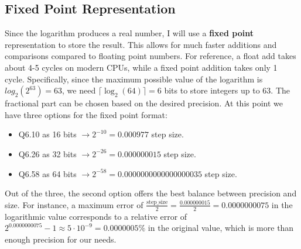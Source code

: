 \documentclass[11pt]{article}
\begin{document}
\subsection{Fixed Point Representation}
Since the logarithm produces a real number, I will use a \textbf{fixed point} representation to store the result. This allows for much faster additions and comparisons compared to floating point numbers. For reference, a float add takes about 4-5 cycles on modern CPUs\textsuperscript{\cite{agner2024}}, while a fixed point addition takes only 1 cycle. Specifically, since the maximum possible value of the logarithm is $log_2(2^{63}) = 63$, we need $\lceil \log_2(64) \rceil = 6$ bits to store integers up to 63. The fractional part can be chosen based on the desired precision. At this point we have three options for the fixed point format:
\begin{itemize}
    \item Q6.10 as 16 bits $\rightarrow 2^{-10} = 0.000977$ step size.
    \item Q6.26 as 32 bits $\rightarrow 2^{-26} = 0.000000015$ step size.
    \item Q6.58 as 64 bits $\rightarrow 2^{-58} = 0.0000000000000000035$ step size.
\end{itemize}
Out of the three, the second option offers the best balance between precision and size. For instance, a maximum error of $\frac{\text{step\_size}}{2} = \frac{0.000000015}{2} = 0.0000000075$ in the logarithmic value corresponds to a relative error of $2^{0.0000000075} - 1 \approx 5 \cdot 10^{-9} = 0.0000005\%$ in the original value, which is more than enough precision for our needs.
\end{document}
